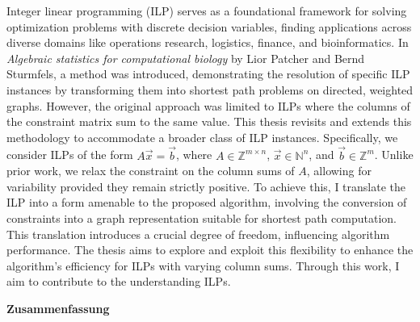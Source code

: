 \documentclass{report}
\theoremstyle{definition}
\begin{document}
Integer linear programming (ILP) serves as a foundational framework for solving optimization problems with discrete decision variables, finding applications across diverse domains like operations research, logistics, finance, and bioinformatics. In \textit{Algebraic statistics for computational biology} by Lior Patcher and Bernd Sturmfels, a method was introduced, demonstrating the resolution of specific ILP instances by transforming them into shortest path problems on directed, weighted graphs. However, the original approach was limited to ILPs where the columns of the constraint matrix sum to the same value. This thesis revisits and extends this methodology to accommodate a broader class of ILP instances. Specifically, we consider ILPs of the form $A\vec x = \vec b$, where $A\in \mathbb{Z}^{m \times n}$, $\vec x \in \mathbb{N}^n$, and $\vec b \in \mathbb{Z}^m$. Unlike prior work, we relax the constraint on the column sums of $A$, allowing for variability provided they remain strictly positive. To achieve this, I translate the ILP into a form amenable to the proposed algorithm, involving the conversion of constraints into a graph representation suitable for shortest path computation. This translation introduces a crucial degree of freedom, influencing algorithm performance. The thesis aims to explore and exploit this flexibility to enhance the algorithm's  efficiency for ILPs with varying column sums. Through this work, I aim to contribute to the understanding ILPs.
\vspace{1.5cm}
\begin{center}
  \Large\textbf{Zusammenfassung}
\end{center}
\end{document}
